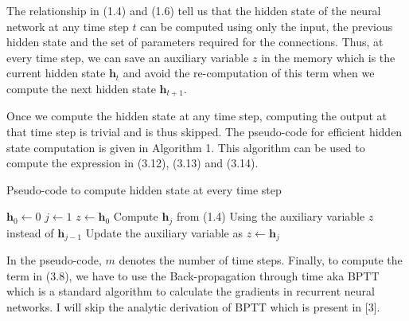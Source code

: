 The relationship in (1.4) and (1.6) tell us that the hidden state of the neural network at any time step $t$ can be computed using only the input, the previous hidden state and the set of parameters required for the connections. Thus, at every time step, we can save an auxiliary variable $z$ in the memory which is the current hidden state $\textbf{h}_{t}$ and avoid the re-computation of this term when we compute the next hidden state $\textbf{h}_{t+1}$. 

Once we compute the hidden state at any time step, computing the output at that time step is trivial and is thus skipped. The pseudo-code for efficient hidden state computation is given in Algorithm 1. This algorithm can be used to compute the expression in (3.12), (3.13) and (3.14). 

\begin{algorithm}
\caption{Pseudo-code to compute hidden state at every time step}
\begin{algorithmic}
\STATE  $\textbf{h}_0 \leftarrow 0$
\STATE  $j \leftarrow 1$
\STATE  $z \leftarrow \textbf{h}_0$
\STATE Compute $\textbf{h}_j$ from (1.4) Using the auxiliary variable $z$ instead of $\textbf{h}_{j-1}$
\STATE Update the auxiliary variable as $z \leftarrow \textbf{h}_j$
\ENDWHILE
\end{algorithmic}
\end{algorithm}

In the pseudo-code, $m$ denotes the number of time steps. Finally, to compute the term in (3.8), we have to use the Back-propagation through time aka BPTT which is a standard algorithm to calculate the gradients in recurrent neural networks. I will skip the analytic derivation of BPTT which is present in [3]. 

  